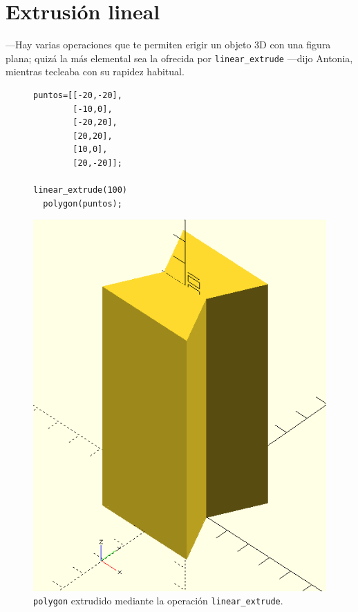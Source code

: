   \section{Extrusión lineal}

  ---Hay varias operaciones que te permiten erigir un objeto 3D con
  una figura plana; quizá la más elemental sea la ofrecida por
  \lstinline!linear_extrude! ---dijo Antonia, mientras tecleaba con su
  rapidez habitual.

  \begin{figure}[ht]
  \begin{minipage}[]{.5\textwidth}%
    \begin{lstlisting}
puntos=[[-20,-20],
        [-10,0],
        [-20,20],
        [20,20],
        [10,0],
        [20,-20]];

linear_extrude(100)         
  polygon(puntos);
\end{lstlisting}
  \end{minipage}\hfill
  \begin{minipage}[]{.5\textwidth}%
      \centering
      \includegraphics[width=.75\textwidth]{imagenes/extrusion-1}
    \end{minipage}
  \caption{\lstinline!polygon! extrudido mediante la operación
    \lstinline!linear_extrude!.}
  \label{fig:extrusion-1}
  \end{figure}

